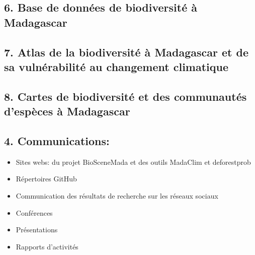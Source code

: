 \documentclass[]{article}
\providecommand{\tightlist}{%
  \setlength{\itemsep}{0pt}\setlength{\parskip}{0pt}}
\begin{document}
\subsection{6. Base de données de biodiversité à
Madagascar}\label{base-de-donnees-de-biodiversite-a-madagascar}

\subsection{7. Atlas de la biodiversité à Madagascar et de sa
vulnérabilité au changement
climatique}\label{atlas-de-la-biodiversite-a-madagascar-et-de-sa-vulnerabilite-au-changement-climatique}

\subsection{8. Cartes de biodiversité et des communautés d'espèces à
Madagascar}\label{cartes-de-biodiversite-et-des-communautes-despeces-a-madagascar}

\subsection{4. Communications:}\label{communications}

\begin{itemize}
\tightlist
\item
  Sites webs: du projet BioSceneMada et des outils MadaClim et
  deforestprob
\item
  Répertoires GitHub
\item
  Communication des résultats de recherche sur les réseaux sociaux
\item
  Conférences
\item
  Présentations
\item
  Rapports d'activités
\end{itemize}


\end{document}
